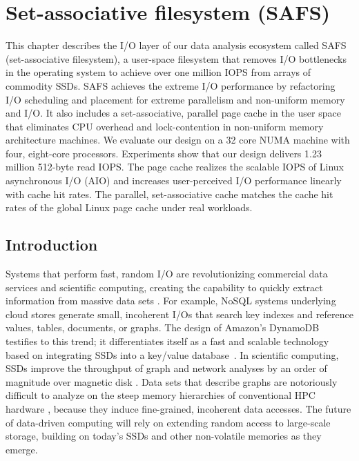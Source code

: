 \chapter{Set-associative filesystem (SAFS)}
\label{sec:safs}

This chapter describes the I/O layer of our data analysis ecosystem called SAFS
(set-associative filesystem), a user-space filesystem that removes I/O bottlenecks
in the operating system to achieve over one million IOPS from arrays of commodity
SSDs. SAFS achieves the extreme I/O performance by refactoring I/O scheduling and
placement for extreme parallelism and non-uniform memory and I/O. It also includes
a set-associative, parallel page cache in the user space that eliminates CPU
overhead and lock-contention in non-uniform memory architecture machines.
We evaluate our design on a 32 core NUMA machine with four, eight-core processors. 
Experiments show that our design delivers 1.23 million 512-byte read IOPS.
The page cache realizes the scalable IOPS of Linux asynchronous I/O (AIO) 
and increases user-perceived I/O performance linearly with cache hit rates.
The parallel, set-associative cache matches the cache hit rates
of the global Linux page cache under real workloads.

\section{Introduction}

Systems that perform fast, random I/O are revolutionizing commercial data
services and scientific computing, creating the capability to quickly 
extract information from massive data sets \cite{4thparadigm}.  
For example, NoSQL systems underlying cloud stores generate
small, incoherent I/Os that search key indexes and reference values, tables, documents,
or graphs.  The design of Amazon's DynamoDB testifies to this trend; it differentiates
itself as a fast and scalable technology based on integrating SSDs
into a key/value database~\cite{dynamodb}.  In scientific computing, SSDs improve the throughput 
of graph and network analyses by an order of magnitude over magnetic disk \cite{Pearce10}.
Data sets that describe graphs are notoriously difficult
to analyze on the steep memory hierarchies of conventional HPC hardware 
\cite{Hendrickson09}, because they induce fine-grained, incoherent data accesses.
The future of data-driven computing will rely on extending random access to large-scale 
storage, building on today's SSDs and other non-volatile memories as they emerge.

